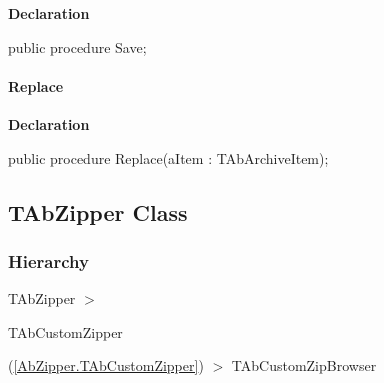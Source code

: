 \documentclass{report}
\newif\ifpdf
\begin{document}
\label{AbZipper.TAbCustomZipper-Save}
\begin{list}{}{
\setlength{\itemindent}{0cm}
\setlength{\listparindent}{0cm}
\setlength{\leftmargin}{\evensidemargin}
\addtolength{\leftmargin}{\tmplength}
\settowidth{\labelsep}{X}
\addtolength{\leftmargin}{\labelsep}
\setlength{\labelwidth}{\tmplength}
}
\item[\textbf{Declaration}\hfill]
\ifpdf
\begin{flushleft}
\fi
\begin{ttfamily}
public procedure Save;\end{ttfamily}

\ifpdf
\end{flushleft}
\fi

\end{list}
\paragraph*{Replace}\hspace*{\fill}

\label{AbZipper.TAbCustomZipper-Replace}
\begin{list}{}{
\setlength{\itemindent}{0cm}
\setlength{\listparindent}{0cm}
\setlength{\leftmargin}{\evensidemargin}
\addtolength{\leftmargin}{\tmplength}
\settowidth{\labelsep}{X}
\addtolength{\leftmargin}{\labelsep}
\setlength{\labelwidth}{\tmplength}
}
\item[\textbf{Declaration}\hfill]
\ifpdf
\begin{flushleft}
\fi
\begin{ttfamily}
public procedure Replace(aItem : TAbArchiveItem);\end{ttfamily}

\ifpdf
\end{flushleft}
\fi

\end{list}
\ifpdf
\subsection*{\large{\textbf{TAbZipper Class}}\normalsize\hspace{1ex}\hrulefill}
\else
\subsection*{TAbZipper Class}
\fi
\label{AbZipper.TAbZipper}
\subsubsection*{\large{\textbf{Hierarchy}}\normalsize\hspace{1ex}\hfill}
TAbZipper {$>$} \begin{ttfamily}TAbCustomZipper\end{ttfamily}(\ref{AbZipper.TAbCustomZipper}) {$>$} 
TAbCustomZipBrowser
\end{document}

